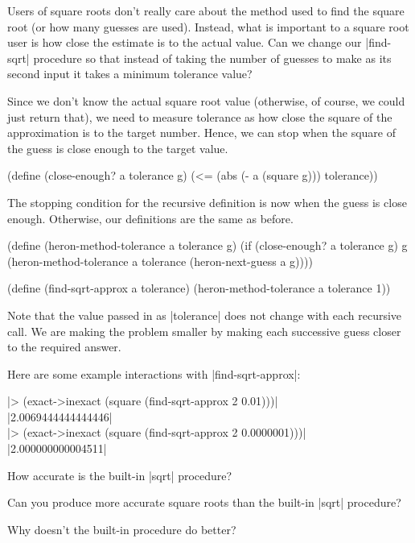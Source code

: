 \begin{schemeregion}
{Users of square roots don't really care about the method used to find the square root (or how many guesses are used).  Instead, what is important to a square root user is how close the estimate is to the actual value.  Can we change our \scheme|find-sqrt| procedure so that instead of taking the number of guesses to make as its second input it takes a minimum tolerance value?

Since we don't know the actual square root value (otherwise, of course, we could just return that), we need to measure tolerance as how close the square of the approximation is to the target number.  Hence, we can stop when the square of the guess is close enough to the target value.
\begin{schemedisplay}
(define (close-enough? a tolerance g)
  (<= (abs (- a (square g))) tolerance))
\end{schemedisplay}
The stopping condition for the recursive definition is now when the guess is close enough.  Otherwise, our definitions are the same as before.
\begin{schemedisplay}
(define (heron-method-tolerance a tolerance g)
  (if (close-enough? a tolerance g) 
      g
      (heron-method-tolerance a tolerance (heron-next-guess a g))))

(define (find-sqrt-approx a tolerance)
  (heron-method-tolerance a tolerance 1))
\end{schemedisplay}
Note that the value passed in as \scheme|tolerance| does not change with each recursive call.  We are making the problem smaller by making each successive guess closer to the required answer.

Here are some example interactions with \scheme|find-sqrt-approx|:
\begin{code}
\scheme|> (exact->inexact (square (find-sqrt-approx 2 0.01)))|\\
\schemeresult|2.0069444444444446|\\
\scheme|> (exact->inexact (square (find-sqrt-approx 2 0.0000001)))|\\
\schemeresult|2.000000000004511|
\end{code}


\begin{subexerciselist}
\item How accurate is the built-in \scheme|sqrt| procedure?
\item Can you produce more accurate square roots than the built-in \scheme|sqrt| procedure? 
\item Why doesn't the built-in procedure do better?
\end{subexerciselist}
}


\end{schemeregion}
